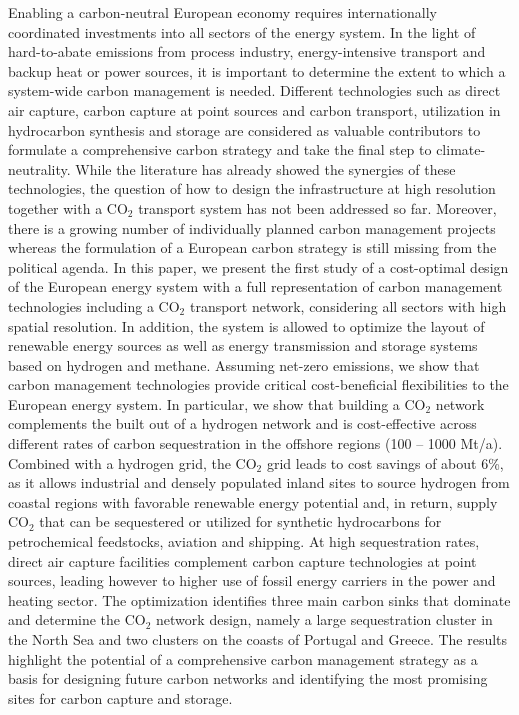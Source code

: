 Enabling a carbon-neutral European economy requires internationally coordinated investments into all sectors of the energy system. In the light of hard-to-abate emissions from process industry, energy-intensive transport and backup heat or power sources, it is important to determine the extent to which a system-wide carbon management is needed. Different technologies such as direct air capture, carbon capture at point sources and carbon transport, utilization in hydrocarbon synthesis and storage are considered as valuable contributors to formulate a comprehensive carbon strategy and take the final step to climate-neutrality.
While the literature has already showed the synergies of these technologies, the question of how to design the infrastructure at high resolution together with a CO$_2$ transport system has not been addressed so far. Moreover, there is a growing number of individually planned carbon management projects whereas the formulation of a European carbon strategy is still missing from the political agenda.
In this paper, we present the first study of a cost-optimal design of the European energy system with a full representation of carbon management technologies including a CO$_2$ transport network, considering all sectors with high spatial resolution. In addition, the system is allowed to optimize the layout of renewable energy sources as well as energy transmission and storage systems based on hydrogen and methane.
Assuming net-zero emissions, we show that carbon management technologies provide critical cost-beneficial flexibilities to the European energy system. In particular, we show that building a CO$_2$ network complements the built out of a hydrogen network and is cost-effective across different rates of carbon sequestration in the offshore regions (100 -- 1000 Mt/a). Combined with a hydrogen grid, the CO$_2$ grid leads to cost savings of about 6\%, as it allows industrial and densely populated inland sites to source hydrogen from coastal regions with favorable renewable energy potential and, in return, supply CO$_2$ that can be sequestered or utilized for synthetic hydrocarbons for petrochemical feedstocks, aviation and shipping. At high sequestration rates, direct air capture facilities complement carbon capture technologies at point sources, leading however to higher use of fossil energy carriers in the power and heating sector. The optimization identifies three main carbon sinks that dominate and determine the CO$_2$ network design, namely a large sequestration cluster in the North Sea and two clusters on the coasts of Portugal and Greece.
The results highlight the potential of a comprehensive carbon management strategy as a basis for designing future carbon networks and identifying the most promising sites for carbon capture and storage.
